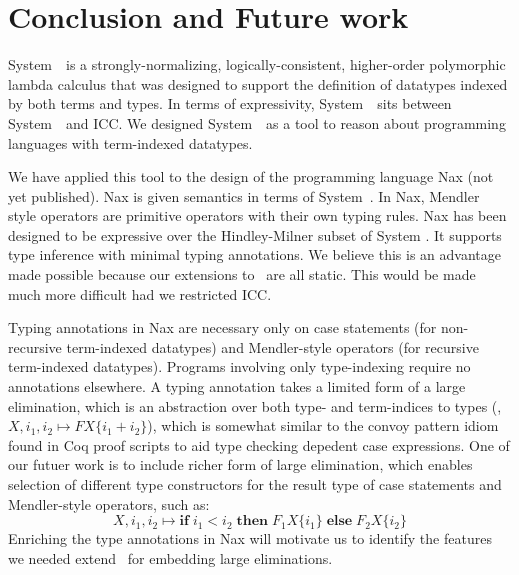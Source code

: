 \section{Conclusion and Future work}
\label{sec:concl}

System~\Fi\ is a strongly-normalizing, logically-consistent, higher-order
polymorphic lambda calculus that was designed to support the
definition of datatypes indexed by both terms and types.
In terms of expressivity, System~\Fi\ sits between System~\Fw\ and ICC.
We designed System~\Fi\ as a tool to reason about programming
languages with term-indexed datatypes. 

We have applied this tool to the design of the programming language Nax (not yet published).
Nax is given semantics in terms of System~\Fi . In Nax, Mendler style operators
are primitive operators with their own typing rules. Nax has been designed to
be expressive over the Hindley-Milner subset of System \Fi. It supports type
inference with minimal typing annotations. We believe this is an advantage
made possible because our extensions to \Fw\ are all static. This would be made
much more difficult had we restricted ICC.

Typing annotations in Nax are necessary only
on case statements (for non-recursive term-indexed datatypes)
and Mendler-style operators (for recursive term-indexed datatypes).
Programs involving only type-indexing require no annotations elsewhere.
A typing annotation takes a limited form of a large elimination,
which is an abstraction over both type- and term-indices to types
(\eg, $X,i_1,i_2 \mapsto F X \{i_1 + i_2\}$), which is somewhat similar to
the convoy pattern idiom \cite{cpdt} found in Coq proof scripts to aid
type checking depedent case expressions.
One of our futuer work
is to include richer form of large elimination, which enables selection
of different type constructors for the result type of case statements
and Mendler-style operators, such as:
\[ X,i_1,i_2 \mapsto \textbf{if}\;i_1<i_2\;
	\textbf{then}\; F_1 X \{i_1\}\;\textbf{else}\;F_2 X \{i_2\} \]
Enriching the type annotations in Nax will motivate us to identify
the features we needed extend \Fi\ for embedding large eliminations.

 

